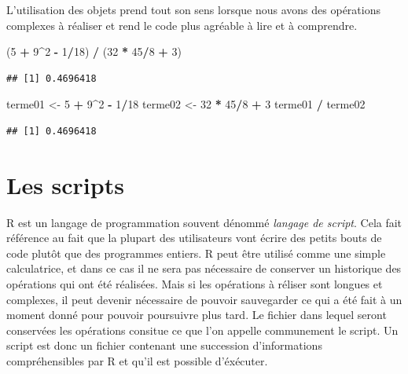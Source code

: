 \documentclass[]{book}
\newenvironment{Shaded}{\begin{snugshade}}{\end{snugshade}}
\newcommand{\DecValTok}[1]{\textcolor[rgb]{0.00,0.00,0.81}{#1}}
\newcommand{\StringTok}[1]{\textcolor[rgb]{0.31,0.60,0.02}{#1}}
\newcommand{\OperatorTok}[1]{\textcolor[rgb]{0.81,0.36,0.00}{\textbf{#1}}}
\newcommand{\NormalTok}[1]{#1}
\begin{document}
L'utilisation des objets prend tout son sens lorsque nous avons des
opérations complexes à réaliser et rend le code plus agréable à lire et
à comprendre.

\begin{Shaded}
\begin{Highlighting}[]
\NormalTok{(}\DecValTok{5} \OperatorTok{+}\StringTok{ }\DecValTok{9}\OperatorTok{^}\DecValTok{2} \OperatorTok{-}\StringTok{ }\DecValTok{1}\OperatorTok{/}\DecValTok{18}\NormalTok{) }\OperatorTok{/}\StringTok{ }\NormalTok{(}\DecValTok{32} \OperatorTok{*}\StringTok{ }\DecValTok{45}\OperatorTok{/}\DecValTok{8} \OperatorTok{+}\StringTok{ }\DecValTok{3}\NormalTok{)}
\end{Highlighting}
\end{Shaded}

\begin{verbatim}
## [1] 0.4696418
\end{verbatim}

\begin{Shaded}
\begin{Highlighting}[]
\NormalTok{terme01 <-}\StringTok{ }\DecValTok{5} \OperatorTok{+}\StringTok{ }\DecValTok{9}\OperatorTok{^}\DecValTok{2} \OperatorTok{-}\StringTok{ }\DecValTok{1}\OperatorTok{/}\DecValTok{18}
\NormalTok{terme02 <-}\StringTok{ }\DecValTok{32} \OperatorTok{*}\StringTok{ }\DecValTok{45}\OperatorTok{/}\DecValTok{8} \OperatorTok{+}\StringTok{ }\DecValTok{3}
\NormalTok{terme01 }\OperatorTok{/}\StringTok{ }\NormalTok{terme02}
\end{Highlighting}
\end{Shaded}

\begin{verbatim}
## [1] 0.4696418
\end{verbatim}

\section{Les scripts}\label{les-scripts}

R est un langage de programmation souvent dénommé \emph{langage de
script}. Cela fait référence au fait que la plupart des utilisateurs
vont écrire des petits bouts de code plutôt que des programmes entiers.
R peut être utilisé comme une simple calculatrice, et dans ce cas il ne
sera pas nécessaire de conserver un historique des opérations qui ont
été réalisées. Mais si les opérations à réliser sont longues et
complexes, il peut devenir nécessaire de pouvoir sauvegarder ce qui a
été fait à un moment donné pour pouvoir poursuivre plus tard. Le fichier
dans lequel seront conservées les opérations consitue ce que l'on
appelle communement le script. Un script est donc un fichier contenant
une succession d'informations compréhensibles par R et qu'il est
possible d'éxécuter.
\end{document}
